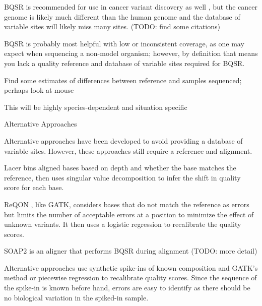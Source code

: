\documentclass{article}
\begin{document}
\begin{outline}
\begin{outline}
\begin{outline}
\begin{outline}
			\end{outline}
			\item BQSR is recommended for use in cancer variant discovery as well \parencite{cibulskis_sensitive_2013}, but the cancer genome is likely much different than the human genome and the database of variable sites will likely miss many sites. (TODO: find some citations)
		\end{outline}
		\item BQSR is probably most helpful with low or inconsistent coverage, as one may expect when sequencing a non-model organism; however, by definition that means you lack a quality reference and database of variable sites required for BQSR.
			\begin{outline}
				\item Find some estimates of differences between reference and samples sequenced; perhaps look at mouse
				\item This will be highly species-dependent and situation specific
			\end{outline}
		\item Alternative Approaches
			\begin{outline}
			\item Alternative approaches have been developed to avoid providing a database of variable sites. However, these approaches still require a reference and alignment.
			\item Lacer \parencite{chung_lacer:_2017} bins aligned bases based on depth and whether the base matches the reference, then uses singular value decomposition to infer the shift in quality score for each base.
			\item ReQON \parencite{cabanski_reqon:_2012}, like GATK, considers bases that do not match the reference as errors but limits the number of acceptable errors at a position to minimize the effect of unknown variants. It then uses a logistic regression to recalibrate the quality scores.
			\item SOAP2 \parencite{li_soap2:_2009} is an aligner that performs BQSR during alignment (TODO: more detail)
			\item Alternative approaches use synthetic spike-ins of known composition and GATK's method \parencite{zook_synthetic_2012} or piecewise regression \parencite{ni_improvement_2016} to recalibrate quality scores. Since the sequence of the spike-in is known before hand, errors are easy to identify as there should be no biological variation in the spiked-in sample.
			\end{outline}

\end{outline}
\end{outline}
\end{document}
